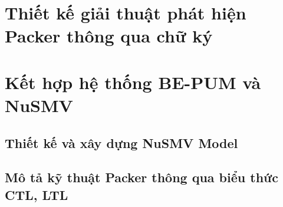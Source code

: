 \section{Thiết kế giải thuật phát hiện Packer thông qua chữ ký}

\section{Kết hợp hệ thống BE-PUM và NuSMV}

\subsection{Thiết kế và xây dựng NuSMV Model}

\subsection{Mô tả kỹ thuật Packer thông qua biểu thức CTL, LTL}